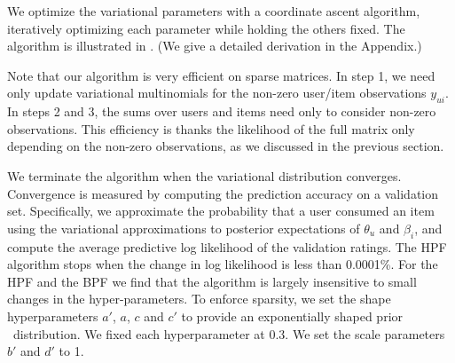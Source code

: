 
We optimize the variational parameters with a coordinate ascent
algorithm, iteratively optimizing each parameter while holding the
others fixed.  The algorithm is illustrated in .  (We
give a detailed derivation in the Appendix.)

Note that our algorithm is very efficient on sparse matrices. In step
1, we need only update variational multinomials for the non-zero
user/item observations $y_{ui}$.  In steps 2 and 3, the sums over
users and items need only to consider non-zero observations.  This
efficiency is thanks the likelihood of the full matrix only depending
on the non-zero observations, as we discussed in the previous section.





We terminate the algorithm when the variational distribution
converges. Convergence is measured by computing the prediction
accuracy on a validation set.  Specifically, we approximate the
probability that a user consumed an item using the variational
approximations to posterior expectations of $\theta_u$ and $\beta_i$,
and compute the average predictive log likelihood of the validation
ratings. The HPF algorithm stops when the change in log likelihood is
less than 0.0001\%. For the HPF and the BPF we find that the algorithm
is largely insensitive to small changes in the hyper-parameters. To
enforce sparsity, we set the shape hyperparameters $a'$, $a$, $c$ and
$c'$ to provide an exponentially shaped prior \gam~distribution. We
fixed each hyperparameter at $0.3$. We set the scale parameters $b'$
and $d'$ to 1.

